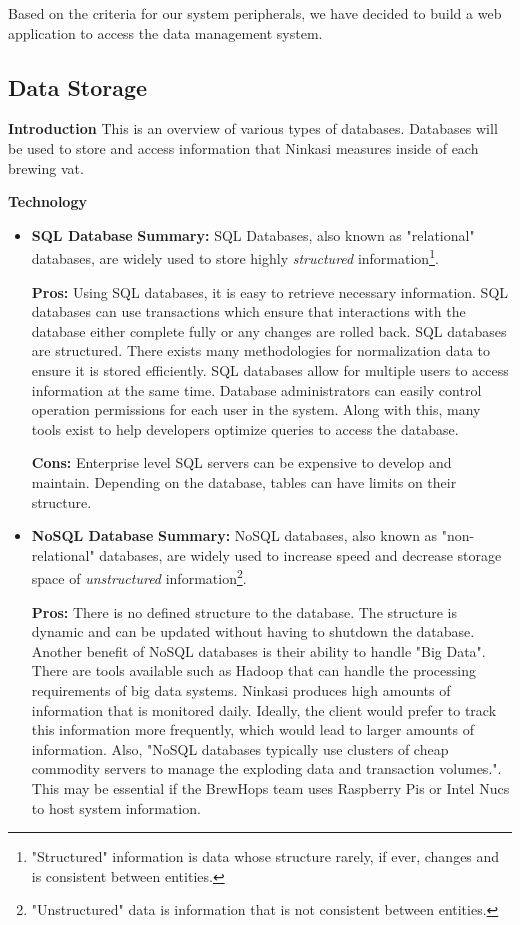 \documentclass[draftclsnofoot,onecolumn,letterpaper,10pt]{IEEEtran}
\begin{document}
			Based on the criteria for our system peripherals, we have decided to build a web application to access the data management system.\\


	\subsection{Data Storage}
		\textbf{Introduction}
		This is an overview of various types of databases. Databases will be used to store and access information that Ninkasi measures inside of each brewing vat.

		\textbf{Technology}
			\begin{itemize}
				\item{\textbf{SQL Database}}
					\textbf{Summary:}
						SQL Databases, also known as "relational" databases, are widely used to store highly \textit{structured} information\footnote{"Structured" information is data whose structure rarely, if ever, changes and is consistent between entities.}.

					\textbf{Pros:}
						Using SQL databases, it is easy to retrieve necessary information.
						SQL databases can use transactions which ensure that interactions with the database either complete fully or any changes are rolled back.
						SQL databases are structured.
						There exists many methodologies for normalization data to ensure it is stored efficiently\cite{TechwallaSQL}.
						SQL databases allow for multiple users to access information at the same time\cite{TechwallaSQLPros}.
						Database administrators can easily control operation permissions for each user in the system.
						Along with this, many tools exist to help developers optimize queries to access the database.

					\textbf{Cons:}
						Enterprise level SQL servers can be expensive to develop and maintain.
						Depending on the database, tables can have limits on their structure\cite{TechwallaSQLCons}.


				\item{\textbf{NoSQL Database}}
					\textbf{Summary:}
						NoSQL databases, also known as "non-relational" databases, are widely used to increase speed and decrease storage space of \textit{unstructured} information\footnote{"Unstructured" data is information that is not consistent between entities.}.

					\textbf{Pros:}
						There is no defined structure to the database.
						The structure is dynamic and can be updated without having to shutdown the database\cite{MongoDBProsCons}.
						Another benefit of NoSQL databases is their ability to handle "Big Data".
						There are tools available such as Hadoop that can handle the processing requirements of big data systems\cite{NoSQLProsCons}.
						Ninkasi produces high amounts of information that is monitored daily.
						Ideally, the client would prefer to track this information more frequently, which would lead to larger amounts of information.
						Also, "NoSQL databases typically use clusters of cheap commodity servers to manage the exploding data and transaction volumes."\cite{NoSQLProsCons}.
						This may be essential if the BrewHops team uses Raspberry Pis or Intel Nucs to host system information.



\end{itemize}
\end{document}
